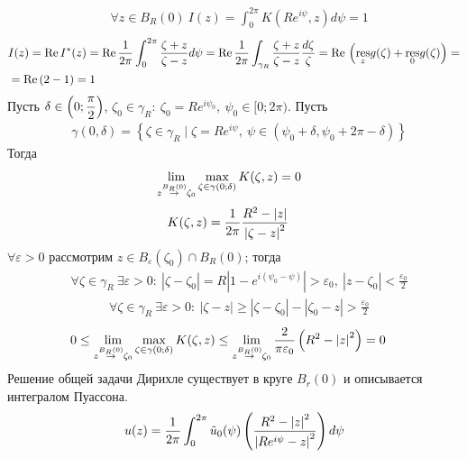 \lemma
\begin{align*}
  &\forall z \in B_R(0) \ I(z) = \int_0^{2\pi}K(Re^{i\psi}, z) d\psi = 1
\end{align*}
\pr
\begin{align*}
  & I(z) = \mathrm{Re}\, I^*(z) = \mathrm{Re}\, \frac{1}{2\pi}\int_0^{2\pi}\frac{\zeta + z}{\zeta - z} d\psi = \mathrm{Re}\, \frac{1}{2\pi}\int_{\gamma_R}\frac{\zeta + z}{\zeta - z} \frac{d\zeta}{\zeta} = \mathrm{Re}\, \left( \underset{z}{\mathrm{res}}g(\zeta) + \underset{0}{\mathrm{res}}g(\zeta)\right) = \\
  & = \mathrm{Re}\,(2 - 1) = 1
\end{align*}
\lemma
Пусть $\delta \in \left( 0;\displaystyle \frac{\pi}{2} \right)$, $\zeta_0 \in \gamma_R: \
\zeta_0 = Re^{i\psi_0}, \ \psi_0 \in [0;2\pi)$. Пусть
\begin{align*}
  & \gamma(0, \delta) = \left\{ \zeta \in \gamma_R \mid \zeta = Re^{i\psi}, \ \psi \in (\psi_0+\delta, \psi_0 +2\pi - \delta) \right\}
\end{align*}
Тогда
\begin{align*}
  & \lim_{z \overset{B_R(0)}{\to} \zeta_0} \max_{\zeta \in \gamma(0;\delta)}K(\zeta, z) = 0
\end{align*}
\pr
\begin{align*}
  & K(\zeta,z) = \frac{1}{2\pi} \frac{R^2-\left|{z}\right|}{ \left|{\zeta - z }\right|^2}
\end{align*}
$\forall \varepsilon > 0$ рассмотрим $z \in B_\varepsilon(\zeta_0) \cap B_R(0)$;
тогда
\begin{align*}
  & \forall \zeta \in \gamma_R \ \exists \varepsilon > 0: \ \left| \zeta - \zeta_0 \right| = R\left| 1-e^{i(\psi_0-\psi)} \right| > \varepsilon_0, \ \left| z - \zeta_0 \right| < \frac{\varepsilon_0}{2}
\end{align*}
\begin{align*}
  & \forall \zeta \in \gamma_R \ \exists \varepsilon > 0: \ \left| \zeta - z \right| \geq \left| \zeta - \zeta_0 \right| - \left| \zeta_0 - z \right| > \frac{\varepsilon_0}{2}
\end{align*}
\begin{align*}
  & 0 \leq \lim_{z \overset{B_R(0)}{\to} \zeta_0} \max_{\zeta \in \gamma(0;\delta)}K(\zeta, z) \leq \lim_{z \overset{B_R(0)}{\to} \zeta_0}\frac{2}{\pi\varepsilon_0}\left( R^2-\left| z \right|^2 \right) = 0
\end{align*}
\theorem
Решение общей задачи Дирихле существует в круге $B_r(0)$ и описывается
интегралом Пуассона.
\pr
\begin{equation}\label{(26.10)}
    u(z) = \frac{1}{2\pi}\int_{0}^{2\pi}\tilde{u}_0(\psi)\left( \frac{R^2 - \left|{z}\right|^2}{\left| Re^{i\psi} - z \right|^2}\right) d\psi
\end{equation}
